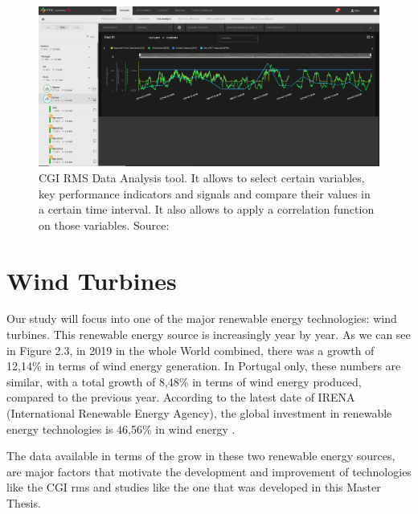 \begin{figure}[htbp]
	\centering
	\includegraphics[width=\textwidth]{Chapters/Figures/background_fig3.PNG}
	\caption{CGI RMS Data Analysis tool. It allows to select certain variables, key performance indicators and signals and compare their values in a certain time interval. It also allows to apply a correlation function on those variables. Source: \cite{CGIRMS} }
	\label{fig:Figuras_Tree_silhouettes-vectorial}
\end{figure}


\section{Wind Turbines} 
\label{sub:if_you_use_this_template} 

Our study will focus into one of the major renewable energy technologies: wind turbines. This renewable energy source is increasingly year by year. As we can see in Figure 2.3, in 2019 in the whole World combined, there was a growth of 12,14\% in terms of wind energy generation. In Portugal only, these numbers are similar, with a total growth of 8,48\% in terms of wind energy produced, compared to the previous year. According to the latest date of IRENA (International Renewable Energy Agency), the global investment in renewable energy technologies is 46,56\% in wind energy \cite{OLD_33_GENERAL}.

The data available in terms of the grow in these two renewable energy sources, are major factors that motivate the development and improvement of technologies like the CGI \acrshort{rms} and studies like the one that was developed in this Master Thesis.


